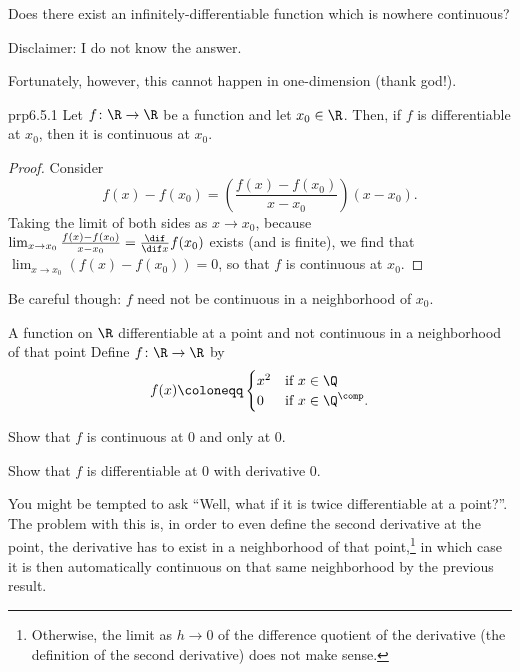 \begin{exr}{}{}
Does there exist an infinitely-differentiable function which is nowhere continuous?
\begin{rmk}
Disclaimer:  I do not know the answer.
\end{rmk}
\end{exr}
Fortunately, however, this cannot happen in one-dimension (thank god!).
\begin{prp}{}{prp6.5.1}
Let $f\colon \R \rightarrow \R$ be a function and let $x_0\in \R$.  Then, if $f$ is differentiable at $x_0$, then it is continuous at $x_0$.
\begin{proof}
Consider
\begin{equation}
f(x)-f(x_0)=\left( \frac{f(x)-f(x_0)}{x-x_0}\right) (x-x_0).
\end{equation}
Taking the limit of both sides as $x\to x_0$, because $\lim _{x\to x_0}\frac{f(x)-f(x_0)}{x-x_0}=\frac{\dif}{\dif x}f(x_0)$ exists (and is finite), we find that $\lim _{x\to x_0}(f(x)-f(x_0))=0$, so that $f$ is continuous at $x_0$.
\end{proof}
\end{prp}
Be careful though:  $f$ need not be continuous in a neighborhood of $x_0$.
\begin{exm}{A function on $\R$ differentiable at a point and not continuous in a neighborhood of that point}{}
Define $f\colon \R \rightarrow \R$ by
\begin{equation}
f(x)\coloneqq \begin{cases}x^2 & \text{if }x\in \Q \\ 0 & \text{if }x\in \Q ^{\comp}.\end{cases}
\end{equation}
\begin{exr}[breakable=false]{}{}
Show that $f$ is continuous at $0$ and only at $0$.
\end{exr}
\begin{exr}[breakable=false]{}{}
Show that $f$ is differentiable at $0$ with derivative $0$.
\end{exr}
\begin{rmk}
You might be tempted to ask ``Well, what if it is twice differentiable at a point?''.  The problem with this is, in order to even define the second derivative at the point, the derivative has to exist in a neighborhood of that point,\footnote{Otherwise, the limit as $h\to 0$ of the difference quotient of the derivative (the definition of the second derivative) does not make sense.} in which case it is then automatically continuous on that same neighborhood by the previous result.
\end{rmk}
\end{exm}

